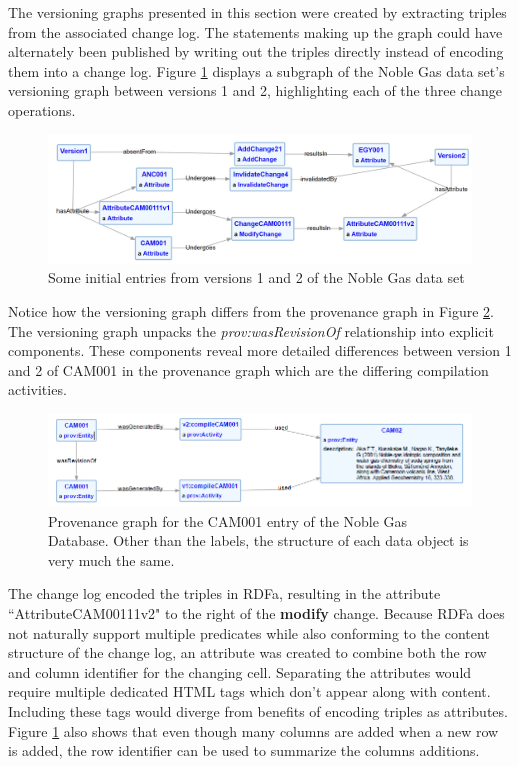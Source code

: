 The versioning graphs presented in this section were created by extracting triples from the associated change log.
The statements making up the graph could have alternately been published by writing out the triples directly instead of encoding them into a change log.
Figure \ref{NobleGraph1} displays a subgraph of the Noble Gas data set's versioning graph between versions 1 and 2, highlighting each of the three change operations.
\begin{figure}
	\centering
	\includegraphics[scale=0.25]{figures/NobleVersion.png}
	\caption{Some initial entries from versions 1 and 2 of the Noble Gas data set}
	\label{NobleGraph1}
\end{figure}
Notice how the versioning graph differs from the provenance graph in Figure \ref{CAM001ProvGraph}.
The versioning graph unpacks the \textit{prov:wasRevisionOf} relationship into explicit components.
These components reveal more detailed differences between version 1 and 2 of CAM001 in the provenance graph which are the differing compilation activities.
\begin{figure}[b]
	\centering
	\includegraphics[scale=0.65]{figures/CAM001v1v2.png}
	\caption{Provenance graph for the CAM001 entry of the Noble Gas Database.  Other than the labels, the structure of each data object is very much the same.}
	\label{CAM001ProvGraph}
\end{figure}
The change log encoded the triples in RDFa, resulting in the attribute ``AttributeCAM00111v2" to the right of the \textbf{modify} change.
Because RDFa does not naturally support multiple predicates while also conforming to the content structure of the change log, an attribute was created to combine both the row and column identifier for the changing cell.
Separating the attributes would require multiple dedicated HTML tags which don't appear along with content.
Including these tags would diverge from benefits of encoding triples as attributes.
Figure \ref{NobleGraph1} also shows that even though many columns are added when a new row is added, the row identifier can be used to summarize the columns additions.

